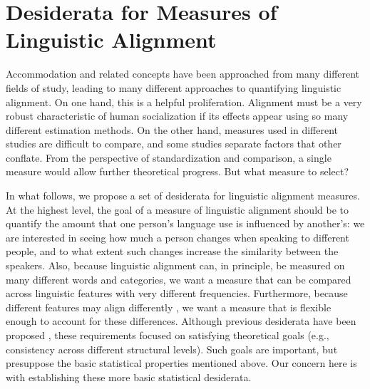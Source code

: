 \documentclass{acm_proc_article-sp}
\begin{document}


\section{Desiderata for Measures of Linguistic Alignment }

Accommodation and related concepts have been approached from many different fields of study, leading to many different approaches to quantifying linguistic alignment. On one hand, this is a helpful proliferation. Alignment must be a very robust characteristic of human socialization if its effects appear using so many different estimation methods.  On the other hand, measures used in different studies are difficult to compare, and some studies separate factors that other conflate. From the perspective of standardization and comparison, a single measure would allow further theoretical progress. But what measure to select? 

In what follows, we propose a set of desiderata for linguistic alignment measures. At the highest level, the goal of a measure of linguistic alignment should be to quantify the amount that one person's language use is influenced by another's: we are interested in seeing how much a person changes when speaking to different people, and to what extent such changes increase the similarity between the speakers. Also, because linguistic alignment can, in principle, be measured on many different words and categories, we want a measure that can be compared across linguistic features with very different frequencies.  Furthermore, because different features may align differently \cite{BilousKrauss1988,Ferrara1991}, we want a measure that is flexible enough to account for these differences. Although previous desiderata have been proposed \cite{XuReitter2015}, these requirements focused on satisfying theoretical goals (e.g., consistency across different structural levels). Such goals are important, but presuppose the basic statistical properties mentioned above. Our concern here is with establishing these more basic statistical desiderata. 
\end{document}
